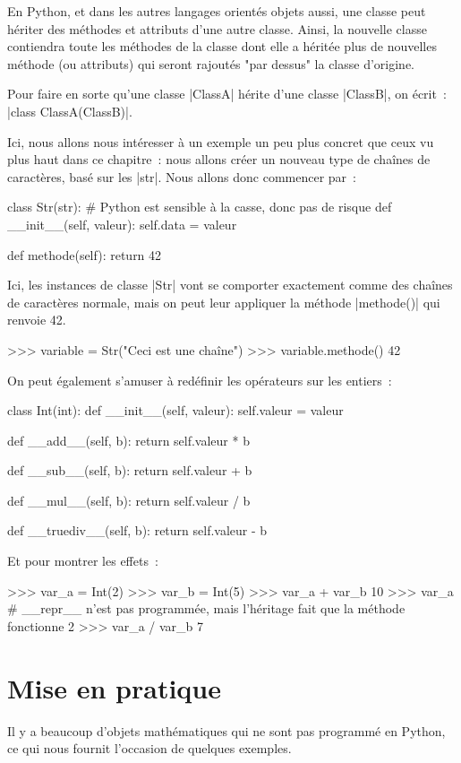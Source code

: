 		En Python, et dans les autres langages orientés objets aussi, une classe peut hériter des méthodes et attributs d'une autre classe. Ainsi, la nouvelle classe contiendra toute les méthodes de la classe dont elle a héritée plus de nouvelles méthode (ou attributs) qui seront rajoutés "par dessus" la classe d'origine.
		
		Pour faire en sorte qu'une classe \python|ClassA| hérite d'une classe \python|ClassB|, on écrit~: \python|class ClassA(ClassB)|.
		
		Ici, nous allons nous intéresser à un exemple un peu plus concret que ceux vu plus haut dans ce chapitre~: nous allons créer un nouveau type de chaînes de caractères, basé sur les \python|str|. Nous allons donc commencer par~:
		\begin{pythoncode}
			class Str(str): # Python est sensible à la casse, donc pas de risque
				def __init__(self, valeur):
					self.data = valeur
				
				def methode(self):
					return 42
		\end{pythoncode}
		Ici, les instances de classe \python|Str| vont se comporter exactement comme des chaînes de caractères normale, mais on peut leur appliquer la méthode \python|methode()| qui renvoie 42.
		\begin{pythoncode}
			>>> variable = Str("Ceci est une chaîne")
			>>> variable.methode()
			42
		\end{pythoncode}
		
		On peut également s'amuser à redéfinir les opérateurs sur les entiers~:
		\begin{pythoncode}
			class Int(int):
				def __init__(self, valeur):
					self.valeur = valeur
				
				def __add__(self, b):
					return self.valeur * b
				
				def __sub__(self, b):
					return self.valeur + b
				
				def __mul__(self, b):
					return self.valeur / b
				
				def __truediv__(self, b):
					return self.valeur - b
		\end{pythoncode}
		Et pour montrer les effets~:
		\begin{pythoncode}
			>>> var_a = Int(2)
			>>> var_b = Int(5)
			>>> var_a + var_b
			10
			>>> var_a # __repr__ n'est pas programmée, mais l'héritage fait que la méthode fonctionne
			2
			>>> var_a / var_b
			7
		\end{pythoncode}

\section{Mise en pratique}
		Il y a beaucoup d'objets mathématiques qui ne sont pas programmé en Python, ce qui nous fournit l'occasion de quelques exemples.

